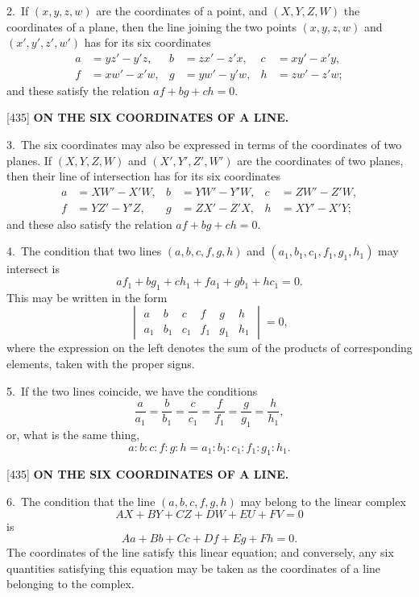 \documentclass[12pt,a4paper]{article}
\newcommand{\paperref}[1]{\textup{[#1]}}
\theoremstyle{definition}
\begin{document}
2.~If $(x, y, z, w)$ are the coordinates of a point, and $(X, Y, Z, W)$ the coordinates of a plane, then the line joining the two points $(x, y, z, w)$ and $(x', y', z', w')$ has for its six coordinates
\begin{align*}
a &= y z' - y' z, & b &= z x' - z' x, & c &= x y' - x' y,\\
f &= x w' - x' w, & g &= y w' - y' w, & h &= z w' - z' w;
\end{align*}
and these satisfy the relation $af + bg + ch = 0$.

\newpage
\setcounter{page}{67}

\noindent\paperref{435}\quad
\textbf{ON THE SIX COORDINATES OF A LINE.}

3.~The six coordinates may also be expressed in terms of the coordinates of two planes. If $(X, Y, Z, W)$ and $(X', Y', Z', W')$ are the coordinates of two planes, then their line of intersection has for its six coordinates
\begin{align*}
a &= X W' - X' W, & b &= Y W' - Y' W, & c &= Z W' - Z' W,\\
f &= Y Z' - Y' Z, & g &= Z X' - Z' X, & h &= X Y' - X' Y;
\end{align*}
and these also satisfy the relation $af + bg + ch = 0$.

4.~The condition that two lines $(a, b, c, f, g, h)$ and $(a_1, b_1, c_1, f_1, g_1, h_1)$ may intersect is
\[
a f_1 + b g_1 + c h_1 + f a_1 + g b_1 + h c_1 = 0.
\]
This may be written in the form
\[
\begin{vmatrix}
a & b & c & f & g & h \\
a_1 & b_1 & c_1 & f_1 & g_1 & h_1
\end{vmatrix}
= 0,
\]
where the expression on the left denotes the sum of the products of corresponding elements, taken with the proper signs.

5.~If the two lines coincide, we have the conditions
\[
\frac{a}{a_1} = \frac{b}{b_1} = \frac{c}{c_1} = \frac{f}{f_1} = \frac{g}{g_1} = \frac{h}{h_1},
\]
or, what is the same thing,
\[
a : b : c : f : g : h = a_1 : b_1 : c_1 : f_1 : g_1 : h_1.
\]

\newpage
\setcounter{page}{68}

\noindent\paperref{435}\quad
\textbf{ON THE SIX COORDINATES OF A LINE.}

6.~The condition that the line $(a, b, c, f, g, h)$ may belong to the linear complex
\[
AX + BY + CZ + DW + EU + FV = 0
\]
is
\[
Aa + Bb + Cc + Df + Eg + Fh = 0.
\]
The coordinates of the line satisfy this linear equation; and conversely, any six quantities satisfying this equation may be taken as the coordinates of a line belonging to the complex.
\end{document}
